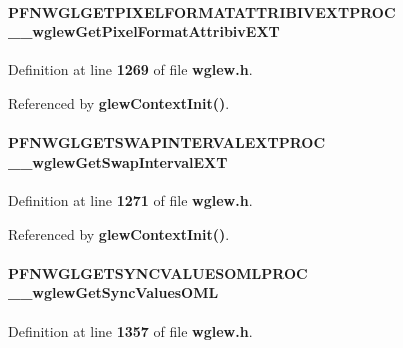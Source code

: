 \paragraph[{\+\_\+\+\_\+wglew\+Get\+Pixel\+Format\+Attribiv\+E\+XT}]{ P\+F\+N\+W\+G\+L\+G\+E\+T\+P\+I\+X\+E\+L\+F\+O\+R\+M\+A\+T\+A\+T\+T\+R\+I\+B\+I\+V\+E\+X\+T\+P\+R\+OC \+\_\+\+\_\+wglew\+Get\+Pixel\+Format\+Attribiv\+E\+XT}\label{wglew_8h_a842d2592b728cdaeca08cf4a43aa1c15}


Definition at line {\bf 1269} of file {\bf wglew.\+h}.



Referenced by {\bf glew\+Context\+Init()}.

\paragraph[{\+\_\+\+\_\+wglew\+Get\+Swap\+Interval\+E\+XT}]{ P\+F\+N\+W\+G\+L\+G\+E\+T\+S\+W\+A\+P\+I\+N\+T\+E\+R\+V\+A\+L\+E\+X\+T\+P\+R\+OC \+\_\+\+\_\+wglew\+Get\+Swap\+Interval\+E\+XT}\label{wglew_8h_a37dc80d4dafff2bc56eabf0ec62f226d}


Definition at line {\bf 1271} of file {\bf wglew.\+h}.



Referenced by {\bf glew\+Context\+Init()}.

\paragraph[{\+\_\+\+\_\+wglew\+Get\+Sync\+Values\+O\+ML}]{ P\+F\+N\+W\+G\+L\+G\+E\+T\+S\+Y\+N\+C\+V\+A\+L\+U\+E\+S\+O\+M\+L\+P\+R\+OC \+\_\+\+\_\+wglew\+Get\+Sync\+Values\+O\+ML}\label{wglew_8h_a6bfc29af75bce993dad8275085fc4b56}


Definition at line {\bf 1357} of file {\bf wglew.\+h}.



